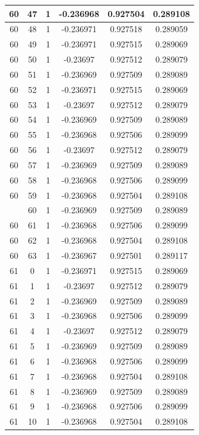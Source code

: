 \documentclass[12pt,a4paper]{article}
\numberwithin{equation}{section}
\numberwithin{figure}{section}
\numberwithin{table}{section}
\begin{document}
\begin{longtable}{|c|c|c|c|c|c|}
60 & 47 & 1 & -0.236968 & 0.927504 & 0.289108 \\ \hline
60 & 48 & 1 & -0.236971 & 0.927518 & 0.289059 \\ \hline
60 & 49 & 1 & -0.236971 & 0.927515 & 0.289069 \\ \hline
60 & 50 & 1 & -0.23697 & 0.927512 & 0.289079 \\ \hline
60 & 51 & 1 & -0.236969 & 0.927509 & 0.289089 \\ \hline
60 & 52 & 1 & -0.236971 & 0.927515 & 0.289069 \\ \hline
60 & 53 & 1 & -0.23697 & 0.927512 & 0.289079 \\ \hline
60 & 54 & 1 & -0.236969 & 0.927509 & 0.289089 \\ \hline
60 & 55 & 1 & -0.236968 & 0.927506 & 0.289099 \\ \hline
60 & 56 & 1 & -0.23697 & 0.927512 & 0.289079 \\ \hline
60 & 57 & 1 & -0.236969 & 0.927509 & 0.289089 \\ \hline
60 & 58 & 1 & -0.236968 & 0.927506 & 0.289099 \\ \hline
60 & 59 & 1 & -0.236968 & 0.927504 & 0.289108 \\ \hline
\pagebreak
60 & 60 & 1 & -0.236969 & 0.927509 & 0.289089 \\ \hline
60 & 61 & 1 & -0.236968 & 0.927506 & 0.289099 \\ \hline
60 & 62 & 1 & -0.236968 & 0.927504 & 0.289108 \\ \hline
60 & 63 & 1 & -0.236967 & 0.927501 & 0.289117 \\ \hline
61 & 0 & 1 & -0.236971 & 0.927515 & 0.289069 \\ \hline
61 & 1 & 1 & -0.23697 & 0.927512 & 0.289079 \\ \hline
61 & 2 & 1 & -0.236969 & 0.927509 & 0.289089 \\ \hline
61 & 3 & 1 & -0.236968 & 0.927506 & 0.289099 \\ \hline
61 & 4 & 1 & -0.23697 & 0.927512 & 0.289079 \\ \hline
61 & 5 & 1 & -0.236969 & 0.927509 & 0.289089 \\ \hline
61 & 6 & 1 & -0.236968 & 0.927506 & 0.289099 \\ \hline
61 & 7 & 1 & -0.236968 & 0.927504 & 0.289108 \\ \hline
61 & 8 & 1 & -0.236969 & 0.927509 & 0.289089 \\ \hline
61 & 9 & 1 & -0.236968 & 0.927506 & 0.289099 \\ \hline
61 & 10 & 1 & -0.236968 & 0.927504 & 0.289108 \\ \hline

\end{longtable}
\end{document}
